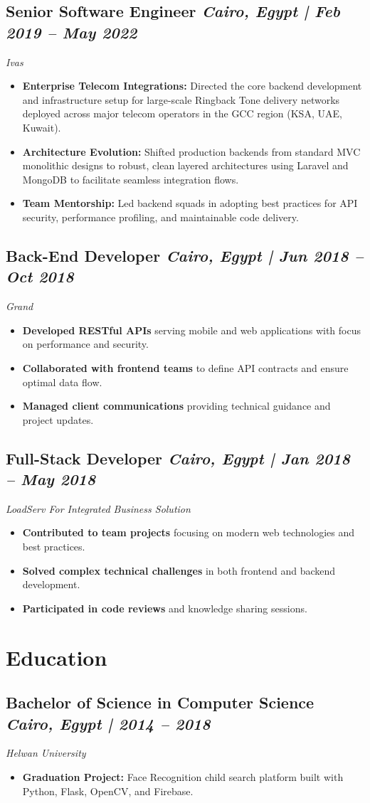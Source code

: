 \documentclass[11pt, a4paper]{article}
\newcommand{\entryheader}[4]{%
  \subsection*{\textbf{\color{accent}#1} \hfill \textcolor{secondary}{\textit{#3 | #4}}}
  \vspace{-0.5ex}
  {\color{secondary}\textit{#2}}
  \vspace{0.5ex}
}
\begin{document}
\entryheader{Senior Software Engineer}{Ivas}{Cairo, Egypt}{Feb 2019 – May 2022}
\begin{itemize}
    \item \textbf{Enterprise Telecom Integrations:} Directed the core backend development and infrastructure setup for large-scale Ringback Tone delivery networks deployed across major telecom operators in the GCC region (KSA, UAE, Kuwait).
    \item \textbf{Architecture Evolution:} Shifted production backends from standard MVC monolithic designs to robust, clean layered architectures using Laravel and MongoDB to facilitate seamless integration flows.
    \item \textbf{Team Mentorship:} Led backend squads in adopting best practices for API security, performance profiling, and maintainable code delivery.
\end{itemize}

\entryheader{Back-End Developer}{Grand}{Cairo, Egypt}{Jun 2018 – Oct 2018}
\begin{itemize}
    \item \textbf{Developed RESTful APIs} serving mobile and web applications with focus on performance and security.
    \item \textbf{Collaborated with frontend teams} to define API contracts and ensure optimal data flow.
    \item \textbf{Managed client communications} providing technical guidance and project updates.
\end{itemize}

\entryheader{Full-Stack Developer}{LoadServ For Integrated Business Solution}{Cairo, Egypt}{Jan 2018 – May 2018}
\begin{itemize}
    \item \textbf{Contributed to team projects} focusing on modern web technologies and best practices.
    \item \textbf{Solved complex technical challenges} in both frontend and backend development.
    \item \textbf{Participated in code reviews} and knowledge sharing sessions.
\end{itemize}

\section*{Education}
\entryheader{Bachelor of Science in Computer Science}{Helwan University}{Cairo, Egypt}{2014 – 2018}
\begin{itemize}
    \item \textbf{Graduation Project:} Face Recognition child search platform built with Python, Flask, OpenCV, and Firebase.
\end{itemize}
\end{document}
